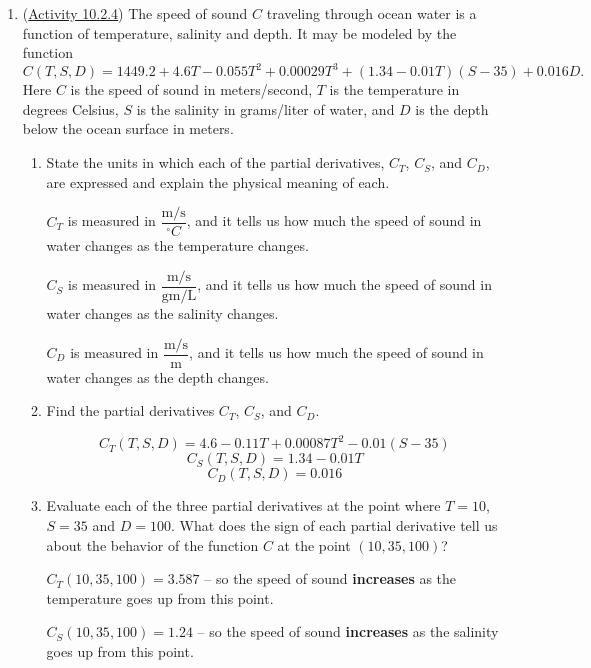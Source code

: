 \documentclass[10pt]{article}
\newenvironment{red}{\color{red}}{\ignorespacesafterend}
\begin{document}
\begin{enumerate}[leftmargin=0pt]
\item (\href{https://activecalculus.org/multi/S-10-2-First-Order-Partial-Derivatives.html#A_10_2_11}{Activity 10.2.4}) The speed of sound $C$ traveling through ocean water is a function of temperature, salinity and depth. It may be modeled by the function
\begin{equation*}
C(T,S, D)=1449.2+4.6T-0.055T^2+0.00029T^3+(1.34-0.01T)(S-35)+0.016D.
\end{equation*}
Here $C$ is the speed of sound in meters/second, $T$ is the temperature in degrees Celsius, $S$ is the salinity in grams/liter of water, and $D$ is the depth below the ocean surface in meters.
\begin{enumerate}
    \item State the units in which each of the partial derivatives, $C_T$, $C_S$, and $C_D$, are expressed and explain the physical meaning of each.
    
    \begin{red}
    $C_T$ is measured in $\dfrac{\textrm{m/s}}{^\circ C}$, and it tells us how much the speed of sound in water changes as the temperature changes.
    
    $C_S$ is measured in $\dfrac{\textrm{m/s}}{\textrm{gm/L}}$, and it tells us how much the speed of sound in water changes as the salinity changes.
    
    $C_D$ is measured in $\dfrac{\textrm{m/s}}{\textrm{m}}$, and it tells us how much the speed of sound in water changes as the depth changes.
    \end{red}
    \item Find the partial derivatives $C_T$, $C_S$, and $C_D$. 
    
    \begin{red}
    \[C_T(T,S, D) = 4.6 - 0.11 T + 0.00087 T^2 -0.01(S-35) \]
    \[C_S(T,S, D) = 1.34-0.01T \]
    \[C_D(T,S, D) = 0.016\]
    \end{red}
    \item Evaluate each of the three partial derivatives at the point where $T=10$, $S=35$ and $D=100$. What does the sign of each partial derivative tell us about the behavior of the function $C$ at the point $(10, 35, 100)$?
    
    \begin{red}
    $C_T(10, 35, 100) = 3.587$ -- so the speed of sound \textbf{increases} as the temperature goes up from this point.
    
    $C_S(10, 35, 100) = 1.24$ -- so the speed of sound \textbf{increases} as the salinity goes up from this point.
    

\end{red}
\end{enumerate}
\end{enumerate}
\end{document}
